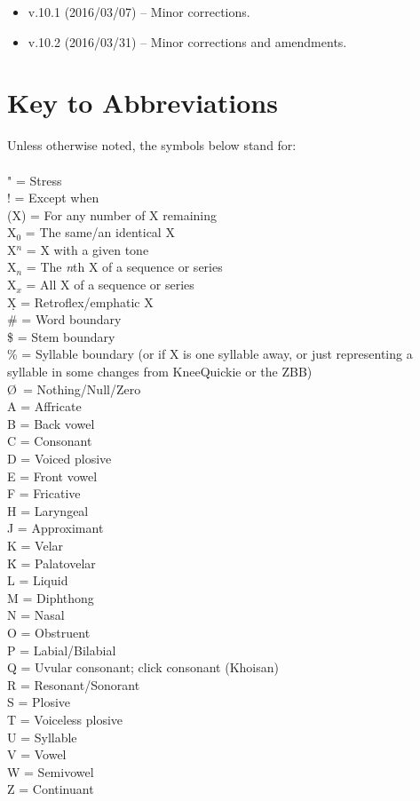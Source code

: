 \documentclass[11pt]{article}
\newcommand{\tab}{\hspace{25pt}}
\begin{document}
\begin{itemize}
\item v.10.1 (2016/03/07) -- Minor corrections.
\item v.10.2 (2016/03/31) -- Minor corrections and amendments.
\end{itemize}
\clearpage

\section{Key to Abbreviations}\tab Unless otherwise noted, the symbols below stand for: \\\\
" = Stress \\
! = Except when\textellipsis \\
(\textellipsis X) = For any number of X remaining \\
X$_0$ = The same/an identical X \\
X$^n$ = X with a given tone\\
X$_n$ = The \textit{n}th X of a sequence or series \\
X$_x$ = All X of a sequence or series\\
\d{X} = Retroflex/emphatic X \\
\# = Word boundary \\
\$ = Stem boundary \\
\% = Syllable boundary (or if X is one syllable away, or just representing a syllable in some changes from KneeQuickie or the ZBB) \\
\O\ = Nothing/Null/Zero \\
A = Affricate \\
B = Back vowel \\
C = Consonant \\
D = Voiced plosive \\
E = Front vowel \\
F = Fricative \\
H = Laryngeal \\
J = Approximant \\
K = Velar \\
\'{K} = Palatovelar \\
L = Liquid \\
M = Diphthong \\
N = Nasal \\
O = Obstruent \\
P = Labial/Bilabial \\
Q = Uvular consonant; click consonant (Khoisan) \\
R = Resonant/Sonorant \\
S = Plosive \\
T = Voiceless plosive \\
U = Syllable \\
V = Vowel \\
W = Semivowel \\
Z = Continuant \clearpage
\end{document}
